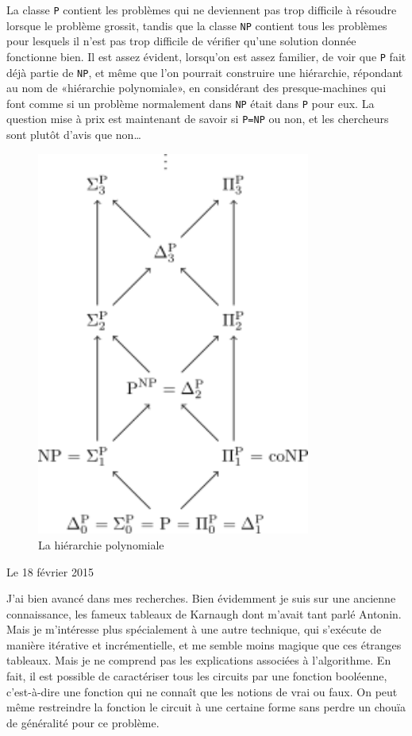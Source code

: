 \documentclass[12pt,final]{report} %
\newcommand{\datemarge}[1]{%
   \newpage
   
        {\hfill{\color{blue}#1}}

}
\newcommand{\majuscule}[1]{{\large \texttt{#1}}}
\begin{document}
\begin{cursive}
{La classe \majuscule{P} contient les problèmes qui ne deviennent pas trop difficile à résoudre lorsque le problème grossit, tandis que la classe \majuscule{NP} contient tous les problèmes pour lesquels il n'est pas trop difficile de vérifier qu'une solution donnée fonctionne bien.
Il est assez évident, lorsqu'on est assez familier, de voir que \majuscule{P} fait déjà partie de \majuscule{NP}, et même que l'on pourrait construire une hiérarchie, répondant au nom de «hiérarchie polynomiale», en considérant des presque-machines qui font comme si un problème normalement dans \majuscule{NP} était dans \majuscule{P} pour eux. 
La question mise à prix est maintenant de savoir si \majuscule{P=NP} ou non, et les chercheurs sont plutôt d'avis que non\dots

\newpage
\begin{figure}[h]
    \centering
    \includegraphics[width=9cm]{hierarchiepo.png} %
    \caption{La hiérarchie polynomiale}
\end{figure}
\newpage



\datemarge{Le 18 février 2015} %

J'ai bien avancé dans mes recherches.
Bien évidemment je suis sur une ancienne connaissance, les fameux tableaux de Karnaugh dont m'avait tant parlé Antonin. 
Mais je m'intéresse plus spécialement à une autre technique, qui s'exécute de manière itérative et incrémentielle, et me semble moins magique que ces étranges tableaux.
Mais je ne comprend pas les explications associées à l'algorithme.
En fait, il est possible de caractériser tous les circuits par une fonction booléenne, c'est-à-dire une fonction qui ne connaît que les notions de vrai ou faux.
On peut même restreindre la fonction le circuit à une certaine forme sans perdre un chouïa de généralité pour ce problème.

}
\end{cursive}
\end{document}
